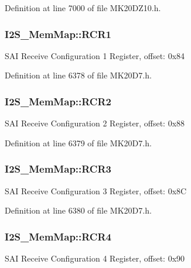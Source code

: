 Definition at line 7000 of file M\+K20\+D\+Z10.\+h.

\subsubsection[{\texorpdfstring{R\+C\+R1}{RCR1}}]{ I2\+S\+\_\+\+Mem\+Map\+::\+R\+C\+R1}\hypertarget{struct_i2_s___mem_map_a260d1f4873f89a5072fce0812f479824}{}\label{struct_i2_s___mem_map_a260d1f4873f89a5072fce0812f479824}
S\+AI Receive Configuration 1 Register, offset\+: 0x84 

Definition at line 6378 of file M\+K20\+D7.\+h.

\subsubsection[{\texorpdfstring{R\+C\+R2}{RCR2}}]{ I2\+S\+\_\+\+Mem\+Map\+::\+R\+C\+R2}\hypertarget{struct_i2_s___mem_map_a29720183f5d0741e5beeb4f68b1f3480}{}\label{struct_i2_s___mem_map_a29720183f5d0741e5beeb4f68b1f3480}
S\+AI Receive Configuration 2 Register, offset\+: 0x88 

Definition at line 6379 of file M\+K20\+D7.\+h.

\subsubsection[{\texorpdfstring{R\+C\+R3}{RCR3}}]{ I2\+S\+\_\+\+Mem\+Map\+::\+R\+C\+R3}\hypertarget{struct_i2_s___mem_map_ae96e284d7e6ec36cb87d0431588c489d}{}\label{struct_i2_s___mem_map_ae96e284d7e6ec36cb87d0431588c489d}
S\+AI Receive Configuration 3 Register, offset\+: 0x8C 

Definition at line 6380 of file M\+K20\+D7.\+h.

\subsubsection[{\texorpdfstring{R\+C\+R4}{RCR4}}]{ I2\+S\+\_\+\+Mem\+Map\+::\+R\+C\+R4}\hypertarget{struct_i2_s___mem_map_af6f0d11fd84c4cb0be68adb569f3f578}{}\label{struct_i2_s___mem_map_af6f0d11fd84c4cb0be68adb569f3f578}
S\+AI Receive Configuration 4 Register, offset\+: 0x90 

